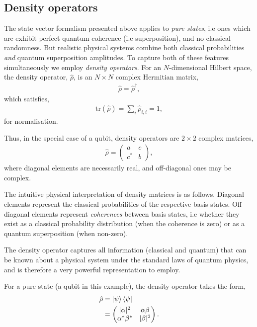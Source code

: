 \documentclass[aps,pra,twocolumn,amsmath,amssymb,nofootinbib,superscriptaddress]{revtex4}
\begin{document}
%
%

\subsection{Density operators}

The state vector formalism presented above applies to \textit{pure states}, i.e ones which are exhibit perfect quantum coherence (i.e superposition), and no classical randomness. But realistic physical systems combine both classical probabilities \textit{and} quantum superposition amplitudes. To capture both of these features simultaneously we employ \textit{density operators}. For an $N$-dimensional Hilbert space, the density operator, $\hat\rho$, is an \mbox{$N\times N$} complex Hermitian matrix,
\begin{align}
	\hat\rho = \hat\rho^\dag,
\end{align}
which satisfies,
\begin{align}
\mathrm{tr}(\hat\rho)=\sum_i \hat\rho_{i,i} = 1,	
\end{align}
for normalisation.

Thus, in the special case of a qubit, density operators are \mbox{$2\times 2$} complex matrices,
\begin{align}
\hat\rho = \left(\begin{matrix}{}
  a & c \nonumber\\
  c^* & b
\end{matrix}\right),
\end{align}
where diagonal elements are necessarily real, and off-diagonal ones may be complex.

The intuitive physical interpretation of density matrices is as follows. Diagonal elements represent the classical probabilities of the respective basis states. Off-diagonal elements represent \textit{coherences} between basis states, i.e whether they exist as a classical probability distribution (when the coherence is zero) or as a quantum superposition (when non-zero).

The density operator captures all information (classical and quantum) that can be known about a physical system under the standard laws of quantum physics, and is therefore a very powerful representation to employ.

For a pure state (a qubit in this example), the density operator takes the form,
\begin{align}
\hat\rho &= \ket\psi\bra\psi\nonumber\\
&= \left(\begin{matrix}{}
  |\alpha|^2 & \alpha\beta \nonumber\\
  \alpha^*\beta^* & |\beta|^2
\end{matrix}\right).
\end{align}
\end{document}

